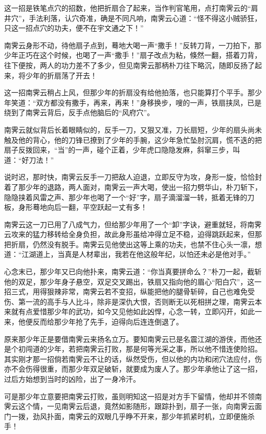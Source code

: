 \documentclass[12pt,oneside]{book}
\begin{document}
这一招是铁笔点穴的招数，他把折扇合了起来，当作判官笔用，点打南霁云的``肩井穴''，手法利落，认穴奇准，确是不同凡响，南霁云心道：``怪不得这小贼骄狂，只这一招点穴的功夫，便不在宇文通之下！''

南霁云身形不动，待他扇子点到，蓦地大喝一声``撒手！''反转刀背，一刀拍下，那少年正巧在这个时候，也喝了一声``撒手！''扇子改点为粘，倏然一翻，搭着刀背，往下便按，两人的功力差不了多少，但见南霁云那柄朴刀往下略沉，随即反扬了起来，将少年的折扇荡了开去！

这一招南霁云稍占上风，但那少年的折扇没有给他拍落，也只能算打个平手。那少年笑道：``双方都没有撒手，再来，再来！''身移换步，嗖的一声，铁扇挟凤，已是绕到了南霁云背后，反手点他脑后的``风府穴''。

南霁云就似背后长着眼睛似的，反手一刀，又狠又准，刀长扇短，少年的扇头尚未触及他的背心，他的刀锋已撩到了少年的手腕，这少年急忙坠肘沉肩，慌不迭的把扇子反拨回来，``当''的一声，碰个正着，少年虎口隐隐发麻，斜窜三步，叫道：``好刀法！''

说时迟，那时快，南霁云反手一刀把敌人迫退，立即反守为攻，身形一旋，恰恰封着了那少年的退路，两人面对，南霁云一声大喝，使出一招力劈华山，朴刀斩下，隐隐挟着风雷之声、那少年也喝了一个``好''字，扇子滴溜溜一转，抵着无锋的刀板，身形蓦地向后一翻，平空跃起一丈有多！

南霁云这一刀已用了八成气力，但给那少年用了一个``卸''字诀，避重就轻，将南霁云攻来的猛力移转给全身负担，故此身形虽给冲得立足不稳，迫得跳跃起来，但那把折扇，仍然没有脱手。南霁云见他使出这等上乘的功夫，也禁不住心头一凛，想道：``江湖道上，当真是人材辈出，我若在他这般年纪，以怕还未必是他对手。''

心念末已，那少年又已向他扑来，南霁云道：``你当真要拼命么？''朴刀一起，截斩他的双足，那少年身子悬空，双足交叉踢出，铁扇又指向他的眉心``阳白穴''，这一招三式，用得狠辣非常，南霁云若不变招，纵能把他的腿骨斩碎，自己也难免受伤、第一流的高手与人比斗，除非是深仇大恨，否则断无以死相拼之理，南霁云本来就有点爱惜那少年的武功，如今又见他如此凶悍，心念一转，立即闪开，如此一来，他便反而给那少年抢了先手，迫得向后连连倒退了。

原来那少年正是要借南霁云来扬名立万。要知南霁云已是名震江湖的游侠，而他还是个初闯道的少年，若把南霁云打败，那是何等光采之事，所以他不惜连使险招。其实刚才那一招倘若南霁云不让的话，纵然受伤，但以他的内功和闭穴法应付，伤亦不会伤得很重，而那少年双足破斩，就要成为废人了。那少年承他让了这一招，过后方始想到当时的凶险，出了一身冷汗。

可是那少年立意要把南霁云打败，虽则明知这一招是对方手下留情，他却并不领南霁云这个情，一见南霁云后退，竟然如影随形，跟踪扑到，扇子一张，向南霁云面门一拨，劲风扑面，南霁云的双眼几乎睁不开来，那少年抓紧时机，立即便施杀手！
\end{document}
